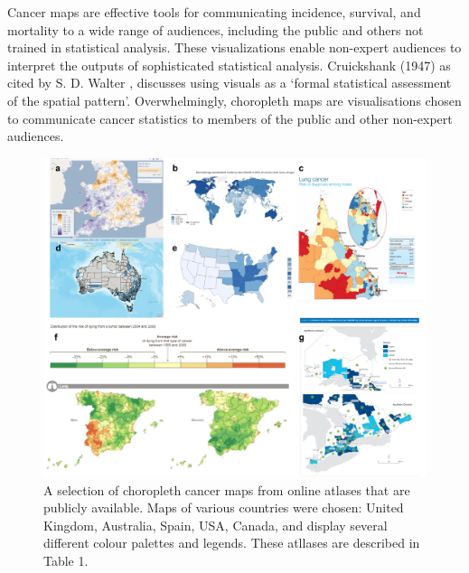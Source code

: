 \documentclass{monashthesis}
\begin{document}
Cancer maps are effective tools for communicating incidence, survival, and mortality to a wide range of audiences, including the public and others not trained in statistical analysis. These visualizations enable non-expert audiences to interpret the outputs of sophisticated statistical analysis. Cruickshank (1947) as cited by S. D. Walter \autocite{DMAHP}, discusses using visuals as a `formal statistical assessment of the spatial pattern'. Overwhelmingly, choropleth maps are visualisations chosen to communicate cancer statistics to members of the public and other non-expert audiences.

\begin{figure}

{\centering \includegraphics[width=1\linewidth]{figures/02-literature/choropleth_grid} 

}

\caption{ A selection of choropleth cancer maps from online atlases that are publicly available. Maps of various countries were chosen: United Kingdom, Australia, Spain, USA, Canada, and display several different colour palettes and legends. These atllases are described in Table 1.}\label{fig:choropleth-grid-create}
\end{figure}

\newpage
\end{document}
